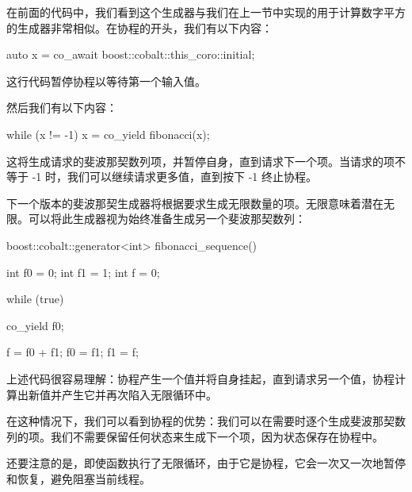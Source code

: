 在前面的代码中，我们看到这个生成器与我们在上一节中实现的用于计算数字平方的生成器非常相似。在协程的开头，我们有以下内容：

\begin{cpp}
auto x = co_await boost::cobalt::this_coro::initial;
\end{cpp}

这行代码暂停协程以等待第一个输入值。

然后我们有以下内容：

\begin{cpp}
while (x != -1) {
    x = co_yield fibonacci(x);
}
\end{cpp}

这将生成请求的斐波那契数列项，并暂停自身，直到请求下一个项。当请求的项不等于 -1 时，我们可以继续请求更多值，直到按下 -1 终止协程。

下一个版本的斐波那契生成器将根据要求生成无限数量的项。无限意味着潜在无限。可以将此生成器视为始终准备生成另一个斐波那契数列：

\begin{cpp}
boost::cobalt::generator<int> fibonacci_sequence() {
    int f0 = 0;
    int f1 = 1;
    int f = 0;

    while (true) {
        co_yield f0;

        f = f0 + f1;
        f0 = f1;
        f1 = f;
    }
}
\end{cpp}

上述代码很容易理解：协程产生一个值并将自身挂起，直到请求另一个值，协程计算出新值并产生它并再次陷入无限循环中。

在这种情况下，我们可以看到协程的优势：我们可以在需要时逐个生成斐波那契数列的项。我们不需要保留任何状态来生成下一个项，因为状态保存在协程中。

还要注意的是，即使函数执行了无限循环，由于它是协程，它会一次又一次地暂停和恢复，避免阻塞当前线程。










